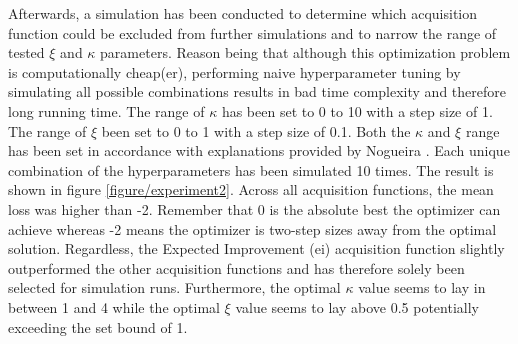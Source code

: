Afterwards, a simulation has been conducted to determine which acquisition function could be excluded from further simulations and to narrow the range of tested $\xi$ and $\kappa$ parameters. Reason being that although this optimization problem is computationally cheap(er), performing naive hyperparameter tuning by simulating all possible combinations results in bad time complexity and therefore long running time. The range of $\kappa$ has been set to 0 to 10 with a step size of 1. The range of $\xi$ been set to 0 to 1 with a step size of 0.1. Both the $\kappa$ and $\xi$ range has been set in accordance with explanations provided by Nogueira \cite{bayesianPythonPackage}. Each unique combination of the hyperparameters has been simulated 10 times. The result is shown in figure \ref{figure/experiment2}. Across all acquisition functions, the mean loss was higher than -2. Remember that 0 is the absolute best the optimizer can achieve whereas -2 means the optimizer is two-step sizes away from the optimal solution. Regardless, the Expected Improvement (ei) acquisition function slightly outperformed the other acquisition functions and has therefore solely been selected for simulation runs. Furthermore, the optimal $\kappa$ value seems to lay in between 1 and 4 while the optimal $\xi$ value seems to lay above 0.5 potentially exceeding the set bound of 1. 

